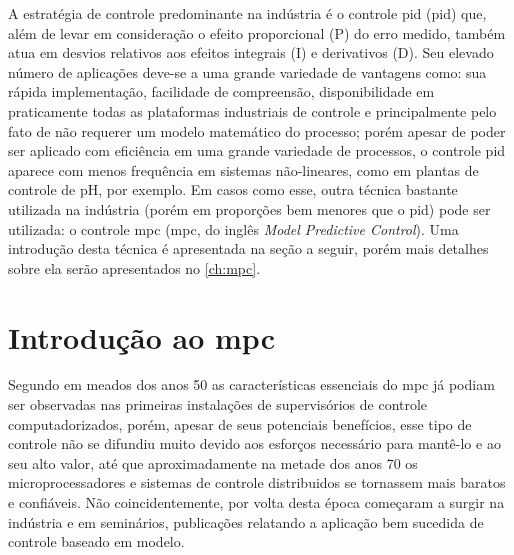 A estratégia de controle predominante na indústria é o controle \acrshort{pid}
(\acrlong{pid}) que, além de levar em consideração o efeito proporcional (P) do erro
medido, também atua em desvios relativos aos efeitos integrais (I) e derivativos (D).
Seu elevado número de aplicações deve-se a uma grande variedade de vantagens como:
sua rápida implementação, facilidade de compreensão, disponibilidade em praticamente
todas as plataformas industriais de controle e principalmente pelo fato de não requerer
um modelo matemático do processo; porém apesar de poder ser aplicado com eficiência em
uma grande variedade de processos, o controle \acrshort{pid} aparece com menos frequência
em sistemas não-lineares, como em plantas de controle de pH, por exemplo. Em casos como
esse, outra técnica bastante utilizada na indústria (porém em proporções bem menores
que o \acrshort{pid}) pode ser utilizada: o controle \acrshort{mpc} (\acrlong{mpc},
do inglês \textit{Model Predictive Control}). Uma introdução desta técnica é apresentada
na seção a seguir, porém mais detalhes sobre ela serão apresentados no \cref{ch:mpc}.


\section{Introdução ao \acrshort{mpc}}
\label{sec:intro_mpc}

Segundo  em meados dos anos 50 as características essenciais do \acrshort{mpc}
já podiam ser observadas nas primeiras instalações de supervisórios de controle computadorizados,
porém, apesar de seus potenciais benefícios, esse tipo de controle não se difundiu muito
devido aos esforços necessário para mantê-lo e ao seu alto valor, até que aproximadamente
na metade dos anos 70 os microprocessadores e sistemas de controle distribuidos se tornassem
mais baratos e confiáveis. Não coincidentemente, por volta desta época começaram a surgir na indústria
e em seminários, publicações relatando a aplicação bem sucedida de controle baseado em modelo. \cite{Lee2011}

